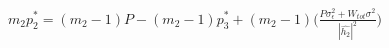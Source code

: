 \documentclass[preview]{standalone}
\begin{document}
\begin{align*}
m_2 p_2^\ast = \left(m_2 - 1\right) P - \left(m_2 - 1\right) p_3^\ast + \left(m_2 - 1\right) \Bigg( \frac{P \sigma_\epsilon^2 + W_{tot} \sigma^2}{\left|\hat{h_2}\right|^2} \Bigg)
\end{align*}
\end{document}
